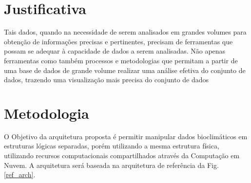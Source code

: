 \documentclass[conference]{IEEEtran}
\begin{document}
%

\section{Justificativa}

Tais dados, quando na necessidade de serem analisados em grandes volumes para obten\c{c}\~{a}o de informa\c{c}\~{o}es precisas e pertinentes, precisam de ferramentas que possam se adequar \`{a} capacidade de dados a serem analisadas. N\~{a}o apenas ferramentas como tamb\'{e}m processos e metodologias que permitam a partir de uma base de dados de grande volume realizar uma an\'{a}lise efetiva do conjunto de dados, trazendo uma visualiza\c{c}\~{a}o mais precisa do conjunto de dados

\section{Metodologia}
O Objetivo da arquitetura proposta \'{e} permitir manipular dados bioclim\'{a}ticos em estruturas l\'{o}gicas separadas, por\'{e}m utilizando a mesma estrutura f\'{i}sica, utilizando recursos computacionais compartilhados atrav\'{e}s da Computa\c{c}\~{a}o em Nuvem. A arquitetura ser\'{a} baseada na arquitetura de refer\^{e}ncia da Fig. \ref{ref_arch}\cite{Hashem:2015}.
\end{document}
